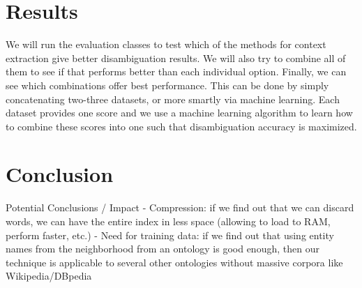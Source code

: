 \documentclass[10pt,a4paper]{article}
\begin{document}
\section{Results}

We will run the evaluation classes to test which of the methods for context extraction give better disambiguation results. We will also try to combine all of them to see if that performs better than each individual option. Finally, we can see which combinations offer best performance. This can be done by simply concatenating two-three datasets, or more smartly via machine learning. Each dataset provides one score and we use a machine learning algorithm to learn how to combine these scores into one such that disambiguation accuracy is maximized.

\section{Conclusion}

Potential Conclusions / Impact
- Compression: if we find out that we can discard words, we can have the entire index in less space (allowing to load to RAM, perform faster, etc.)
- Need for training data: if we find out that using entity names from the neighborhood from an ontology is good enough, then our technique is applicable to several other ontologies without massive corpora like Wikipedia/DBpedia
\end{document}
